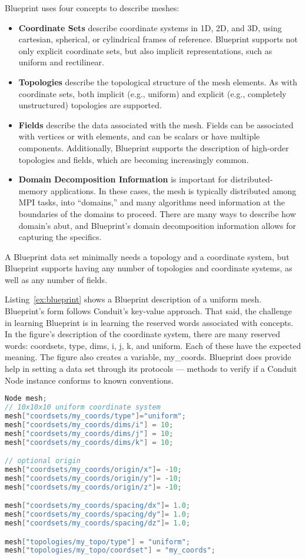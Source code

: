 Blueprint uses four concepts to describe meshes:
\begin{itemize}
  \item \textbf{Coordinate Sets} describe coordinate systems in 1D, 2D, and 3D,
using cartesian, spherical, or cylindrical frames of reference.
%
Blueprint supports not only explicit coordinate sets, but also implicit representations,
such as uniform and rectilinear.
  \item \textbf{Topologies} describe the topological structure of the mesh elements.
%
As with coordinate sets, both implicit (e.g., uniform) and explicit
(e.g., completely unstructured) topologies are supported.
  \item \textbf{Fields} describe the data associated with the mesh.
Fields can be associated with vertices or with elements, and
can be scalars or have multiple components.
%
Additionally, Blueprint supports the description of high-order
topologies and fields, which are becoming increasingly common.
  \item \textbf{Domain Decomposition Information} is important for distributed-memory applications.
%
In these cases, the mesh is typically distributed among MPI tasks, into ``domains,'' and
many algorithms need information at the boundaries of the domains to proceed.
%
There are many ways to describe how domain's abut, and Blueprint's domain decomposition information
allows for capturing the specifics.
\end{itemize}
A Blueprint data set minimally needs a topology and a coordinate system,
but Blueprint supports having any number of topologies and coordinate
systems, as well as any number of fields.
%


Listing~\ref{ex:blueprint} shows a Blueprint description of a uniform mesh.
%
Blueprint's form follows Conduit's key-value approach.
%
That said, the challenge in learning Blueprint is in learning the reserved words associated
with concepts.
%
In the figure's description of the coordinate system, there are many reserved words:
coordsets, type, dims,  i, j, k, and uniform.
%
Each of these have the expected meaning.
%
The figure also creates a variable, my\_coords.
%
Blueprint does provide help in setting a data set through its protocols ---
methods to verify if a Conduit Node instance conforms to known conventions.


\begin{lstlisting}[language=C++,caption={\label{ex:blueprint}An example of a specifying a $10^3$ uniform grid in Blueprint.}]
Node mesh;
// 10x10x10 uniform coordinate system
mesh["coordsets/my_coords/type"]="uniform";
mesh["coordsets/my_coords/dims/i"] = 10;
mesh["coordsets/my_coords/dims/j"] = 10;
mesh["coordsets/my_coords/dims/k"] = 10;

// optional origin
mesh["coordsets/my_coords/origin/x"]= -10;
mesh["coordsets/my_coords/origin/y"]= -10;
mesh["coordsets/my_coords/origin/z"]= -10;

mesh["coordsets/my_coords/spacing/dx"]= 1.0;
mesh["coordsets/my_coords/spacing/dy"]= 1.0;
mesh["coordsets/my_coords/spacing/dz"]= 1.0;

mesh["topologies/my_topo/type"] = "uniform";
mesh["topologies/my_topo/coordset"] = "my_coords";
\end{lstlisting}

